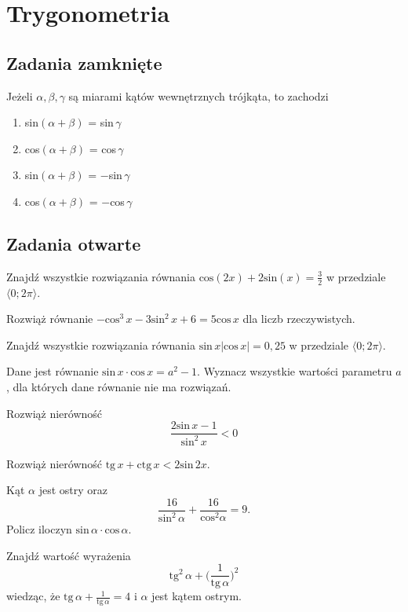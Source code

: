 \setcounter{parc}{0}
\addtocounter{chapc}{1}

\chapter{Trygonometria}

\section{Zadania zamknięte}

\zadanie Jeżeli $\alpha, \beta, \gamma$ są miarami kątów wewnętrznych trójkąta, to zachodzi
\begin{enumerate}[label=\alph*)]
	\item sin$(\alpha + \beta)$ = sin\,$\gamma$ %
	\item cos$(\alpha + \beta)$ = cos\,$\gamma$
	\item sin$(\alpha + \beta)$ = $-$sin\,$\gamma$
	\item cos$(\alpha + \beta)$ = $-$cos\,$\gamma$
\end{enumerate}

\section{Zadania otwarte}

\zadanie Znajdź wszystkie rozwiązania równania $\text{cos}(2x) + 2\text{sin}(x) = \frac{3}{2}$ w przedziale $\langle 0; 2\pi \rangle$.

\zadanie Rozwiąż równanie $-\text{cos}^3\,x -3\text{sin}^2\,x + 6 = 5\text{cos}\,x$ dla liczb rzeczywistych.

\zadanie Znajdź wszystkie rozwiązania równania $\text{sin}\, x|\text{cos}\,x| = 0,25$ w przedziale $\langle 0; 2\pi \rangle$.

\zadanie Dane jest równanie $\text{sin}\,x\cdot\text{cos}\,x = a^2 - 1$. Wyznacz wszystkie wartości parametru $a$, dla których dane równanie nie ma rozwiązań.

\zadanie Rozwiąż nierówność \[ \dfrac{2\text{sin}\, x - 1}{\text{sin}^2\, x} < 0 \]

\zadanie Rozwiąż nierówność $ \text{tg}\,x + \text{ctg}\,x < 2\text{sin}\,2x$.

\zadanie Kąt $\alpha$ jest ostry oraz \[ \dfrac{16}{\text{sin}^2\, \alpha} + \dfrac{16}{\text{cos}^2 \alpha} = 9. \] Policz iloczyn $\text{sin}\, \alpha\cdot\text{cos}\, \alpha$.

\zadanie Znajdź wartość wyrażenia \[\text{tg}^2\,\alpha + \bigg(\frac{1}{\text{tg}\,\alpha}\bigg)^2 \] wiedząc, że $\text{tg}\,\alpha + \frac{1}{\text{tg}\,\alpha} = 4$ i $\alpha$ jest kątem ostrym.